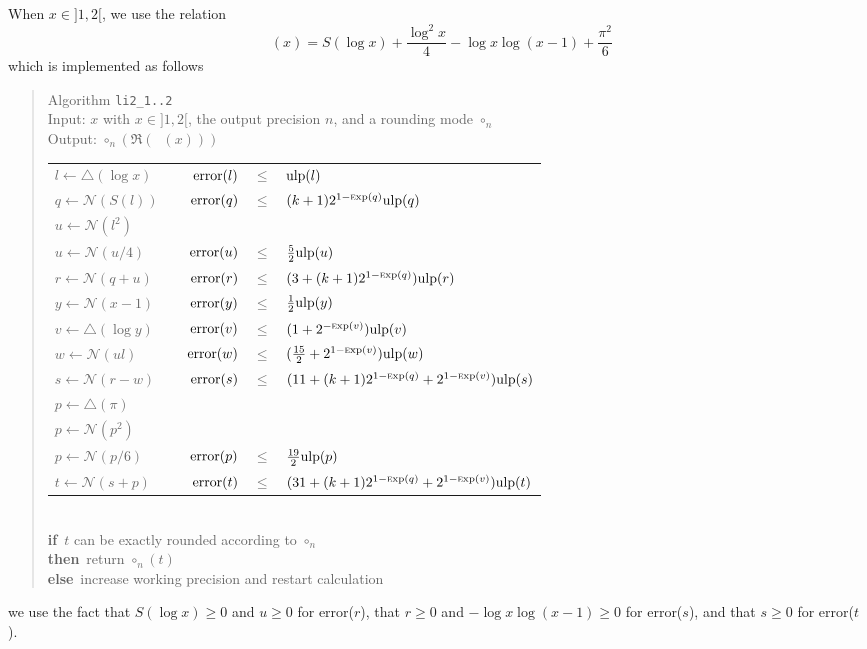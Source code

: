 \documentclass[12pt]{amsart}
\DeclareMathOperator{\LiTwo}{Li_2}
\def\n{\textnormal}
\def\pinf{\bigtriangleup}
\def\ulp{{\rm ulp}}
\def\Exp{{\rm \textsc exp}}
\def\N{{\mathcal N}}
\def\If{{\bf if}}
\def\then{{\bf then}}
\def\Else{{\bf else}}
\begin{document}
When $x \in ]1, 2[$, we use the relation
\[
\LiTwo(x) = S(\log x) + \frac{\log^2 x}{4} - \log x \log(x - 1) + \frac{\pi^2}{6}
\]
which is implemented as follows
\begin{quote}
Algorithm {\tt li2\_1..2}\\
Input: $x$ with $x \in ]1, 2[$, the output precision $n$, and a rounding mode
    $\circ_n$ \\
Output: $\circ_n(\Re(\LiTwo(x)))$ \\
\begin{tabular}{l c r c l}
$l \leftarrow \pinf(\log x)$ & & $\n{error}(l) $ & $ \leq $ & $ \ulp(l)$\\
$q \leftarrow \N(S(l))$ & &
$\n{error}(q) $ & $ \leq $ & $ (k+1)2^{1-\Exp(q)} \ulp(q)$\\

$u \leftarrow \N(l^2)$\\
$u \leftarrow \N(u/4)$ & &
$\n{error}(u) $ & $ \leq $ & $ \frac{5}{2} \ulp(u)$\\
$r \leftarrow \N(q + u)$ & &
$\n{error}(r) $ & $ \leq $ & $ (3+(k+1)2^{1-\Exp(q)})\ulp(r)$\\

$y \leftarrow \N(x - 1)$ & &
$\n{error}(y) $ & $ \leq $ & $ \frac{1}{2}\ulp(y)$ \\
$v \leftarrow \pinf(\log y)$ & &
$\n{error}(v) $ & $ \leq $ & $(1 + 2^{-\Exp(v)}) \ulp(v)$\\
$w \leftarrow \N(ul)$ & &
$\n{error}(w) $ & $ \leq $ & $(\frac{15}{2} + 2^{1-\Exp(v)}) \ulp(w)$\\
$s \leftarrow \N(r - w)$ & &
$\n{error}(s) $ & $ \leq $ &
$ (11 + (k+1) 2^{1-\Exp(q)} + 2^{1-\Exp(v)})\ulp(s)$ \\

$p \leftarrow \pinf(\pi)$ \\
$p \leftarrow \N(p^2)$ \\
$p \leftarrow \N(p/6)$ & &
$\n{error}(p) $ & $ \leq $ & $ \frac{19}{2}\ulp(p)$\\
$t \leftarrow \N(s + p)$ & &
$\n{error}(t) $ & $ \leq $ &
$ (31 + (k+1) 2^{1-\Exp(q)} + 2^{1-\Exp(v)}) \ulp(t)$
\end{tabular}\\
\If\ $t$ can be exactly rounded according to $\circ_n$\\
\then\ return $\circ_n(t)$\\
\Else\ increase working precision and restart calculation
\end{quote}

we use the fact that $S(\log x) \geq 0$ and $u \geq 0$ for error($r$),
that $r \geq 0$ and $-\log x \log(x-1) \geq 0$ for error($s$),
and that $s \geq 0$ for error($t$).
\end{document}
